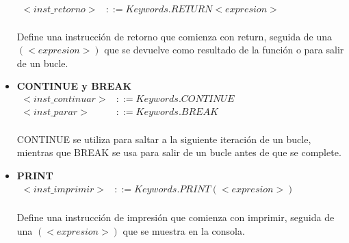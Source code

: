 \begin{itemize}
\begin{math}
    \begin{array}{rl}
      <inst\_retorno> & ::= Keywords.RETURN <expresion>
    \end{array}
  \end{math} \\\\
  Define una instrucción de retorno que comienza con return, seguida de una $(<expresion>)$ que se devuelve como resultado de la función o para salir de un bucle.
  \item \textbf{CONTINUE y BREAK} \\
  \begin{math}
    \begin{array}{rl}
      <inst\_continuar> & ::= Keywords.CONTINUE \\
      <inst\_parar> & ::= Keywords.BREAK
    \end{array}
  \end{math} \\\\
  CONTINUE se utiliza para saltar a la siguiente iteración de un bucle, mientras que BREAK se usa para salir de un bucle antes de que se complete.
  \item \textbf{PRINT} \\
  \begin{math}
    \begin{array}{rl}
      <inst\_imprimir> & ::= Keywords.PRINT (<expresion>)
    \end{array}
  \end{math} \\\\
  Define una instrucción de impresión que comienza con imprimir, seguida de una $(<expresion>)$ que se muestra en la consola.
\end{itemize}

